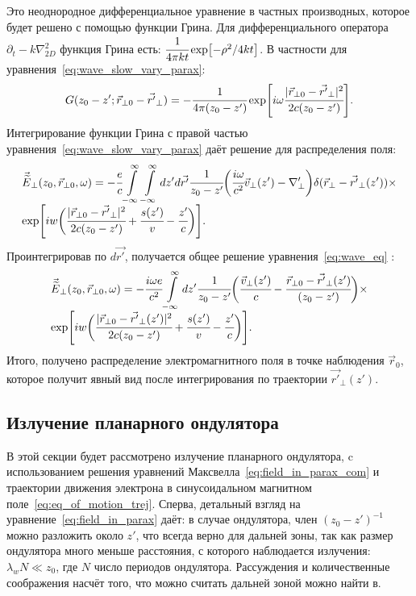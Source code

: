 Это неоднородное дифференциальное уравнение в частных производных, которое будет решено с помощью функции Грина. Для дифференциального оператора $\partial_t - k\nabla_{2D}^2$ функция Грина есть: $\cfrac{1}{4\pi kt}\exp[-\rho^2/4kt]$. В частности для уравнения~\ref{eq:wave_slow_vary_parax}:
\begin{equation}
	\label{eq:Green_func}
	G(z_0 - z'; \vec{r}_{\bot 0} - \vec{r'}_{\bot}) = 
	- \cfrac{1}{4\pi (z_0 - z')}\exp[i\omega \cfrac{|\vec{r}_{\bot 0} - \vec{r'}_{\bot}|^2}{2c(z_0 - z')}].
\end{equation} 
Интегрирование функции Грина с правой частью уравнения~\ref{eq:wave_slow_vary_parax} даёт решение для распределения поля:
\begin{equation}
	\begin{array}{lcl}
		\vec{\widetilde{E}}_{\bot}(z_0,  \vec{r}_{\bot 0}, \omega) = -\cfrac{e}{c}  \displaystyle\int\limits_{-\infty}^{\infty}\int\limits_{-\infty}^{\infty} dz'd\vec{r'}\cfrac{1}{z_0 - z'}
		\bigg(\cfrac{i\omega}{c^2}\vec{v}_{\bot}(z')
		-\nabla'_{\bot}\bigg) \delta(\vec{r}_{\bot} - \vec{r'}_{\bot}(z'))\times\\
		\exp[iw\bigg( \cfrac{|\vec{r}_{\bot 0} - \vec{r'}_{\bot}|^2}{2c(z_0 - z')} +\cfrac{s(z')}{v} - \cfrac{z'}{c} \bigg)].
	\end{array}	
\end{equation}
Проинтегрировав по $d\vec{r'}$, получается общее решение уравнения~\ref{eq:wave_eq} :
\begin{equation}
	\label{eq:field_in_parax_com}
	\begin{array}{lcl}
		\vec{\widetilde{E}}_{\bot}(z_0,  \vec{r}_{\bot 0}, \omega) = -\cfrac{i\omega e}{c^2}  \displaystyle\int\limits_{-\infty}^{\infty} dz'
		\cfrac{1}{z_0 - z'}
		\bigg(\cfrac{\vec{v}_{\bot}(z')}{c}
		- \cfrac{\vec{r}_{\bot 0} - \vec{r'}_{\bot}(z')}{(z_0 - z')}\bigg)\times\\
		\exp[iw\bigg(\cfrac{|\vec{r}_{\bot 0} - \vec{r'}_{\bot}(z')|^2}{2c(z_0 - z')} + \cfrac{s(z')}{v} - \cfrac{z'}{c} \bigg)].
	\end{array}	
\end{equation}
Итого, получено распределение электромагнитного поля в точке наблюдения $\vec{r}_0$, которое получит явный вид после интегрирования по траектории $\vec{r'}_{\bot}(z')$.

\subsection{Излучение планарного ондулятора}
В этой секции будет рассмотрено излучение планарного ондулятора, c использованием решения уравнений Максвелла~\ref{eq:field_in_parax_com} и траектории движения электрона в синусоидальном магнитном поле~\ref{eq:eq_of_motion_trej}. Сперва, детальный взгляд на уравнение~\ref{eq:field_in_parax} даёт: в случае ондулятора, член $(z_0 - z')^{-1}$ можно разложить около $z'$, что всегда верно для дальней зоны, так как размер ондулятора много меньше расстояния, с которого наблюдается излучения: $\lambda_w N \ll z_0$, где $N$ число периодов ондулятора. Рассуждения и количественные соображения насчёт того, что можно считать дальней зоной можно найти в\cite{geloni2007fourier}.

